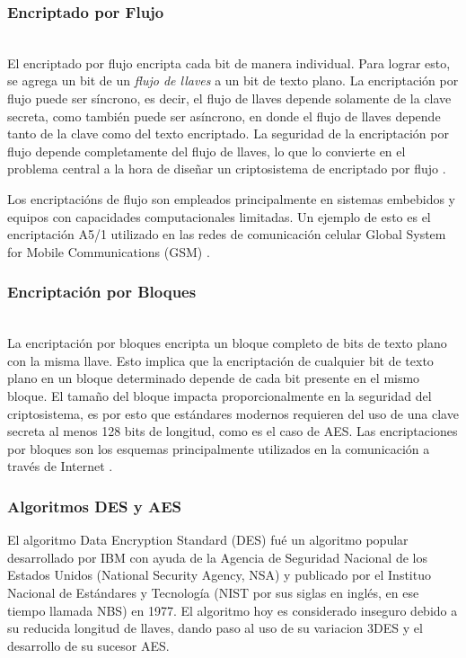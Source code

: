 \subsubsection{Encriptado por Flujo}
\hfil \\
El encriptado por flujo encripta cada bit de manera individual. Para lograr esto, se agrega un bit de un \textit{flujo de llaves} a un bit de texto plano. La encriptación por flujo puede ser síncrono, es decir, el flujo de llaves depende solamente de la clave secreta, como también puede ser asíncrono, en donde el flujo de llaves depende tanto de la clave como del texto encriptado. La seguridad de la encriptación por flujo depende completamente del flujo de llaves, lo que lo convierte en el problema central a la hora de diseñar un criptosistema de encriptado por flujo \cite{paar-2011}.

Los encriptacións de flujo son empleados principalmente en sistemas embebidos y equipos con capacidades computacionales limitadas. Un ejemplo de esto es el encriptación A5/1 utilizado en las redes de comunicación celular  Global System for Mobile Communications (GSM) \cite{paar-2011}.  

\subsubsection{Encriptación por Bloques}
\hfil \\
La encriptación por bloques encripta un bloque completo de bits de texto plano con la misma llave. Esto implica que la encriptación de cualquier bit de texto plano en un bloque determinado depende de cada bit presente en el mismo bloque. El tamaño del bloque impacta proporcionalmente en la seguridad del criptosistema, es por esto que estándares modernos requieren del uso de una clave secreta al menos 128 bits de longitud, como es el caso de AES. Las encriptaciones por bloques son los esquemas principalmente utilizados en la comunicación a través de Internet \cite{paar-2011}.

\subsubsection{Algoritmos DES y AES}
El algoritmo Data Encryption Standard (DES) fué un algoritmo popular desarrollado por IBM con ayuda de la Agencia de Seguridad Nacional de los Estados Unidos (National Security Agency, NSA) y publicado por el Instituo Nacional de Estándares y Tecnología (NIST por sus siglas en inglés, en ese tiempo llamada NBS) en 1977. El algoritmo hoy es considerado inseguro debido a su reducida longitud de llaves, dando paso al uso de su variacion 3DES y el desarrollo de su sucesor AES.

